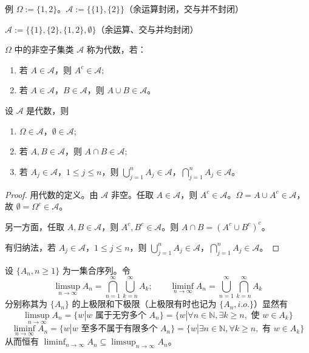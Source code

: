 \documentclass[lang=cn,10pt,thmcnt=section]{elegantbook}
\begin{document}
例 \(\Omega := \{1,2\}\)。\(\mathscr{A} := \{\{1\},\{2\}\}\)（余运算封闭，交与并不封闭）

\(\mathscr{A} := \{\{1\},\{2\},\{1,2\},\emptyset\}\)（余运算、交与并均封闭）

\begin{definition}
	\(\Omega\) 中的非空子集类 \(\mathscr{A}\) 称为代数，若：
\begin{enumerate}
    \item 若 \(A \in \mathscr{A}\)，则 \(A^c \in \mathscr{A}\);
    \item 若 \(A \in \mathscr{A}\)，\(B \in \mathscr{A}\)，则 \(A \cup B \in \mathscr{A}\)。
\end{enumerate}
\end{definition}
\begin{theorem}
	设 \(\mathscr{A}\) 是代数，则
\begin{enumerate}
    \item \(\Omega \in \mathscr{A}\)，\(\emptyset \in \mathscr{A}\);
    \item 若 \(A, B \in \mathscr{A}\)，则 \(A \cap B \in \mathscr{A}\);
    \item 若 \(A_j \in \mathscr{A}\)，\(1 \leq j \leq n\)，则 \(\bigcup_{j=1}^{n} A_j \in \mathscr{A}\)，\(\bigcap_{j=1}^{n} A_j \in \mathscr{A}\)。
\end{enumerate}
\end{theorem}
\begin{proof}
	\quad 用代数的定义。由 \(\mathscr{A}\) 非空。任取 \(A \in \mathscr{A}\)，则 \(A^c \in \mathscr{A}\)。\(\Omega = A \cup A^c \in \mathscr{A}\)，故 \(\emptyset = \Omega^c \in \mathscr{A}\)。

另一方面，任取 \(A, B \in \mathscr{A}\)，则 \(A^c, B^c \in \mathscr{A}\)。则 \(A \cap B = (A^c \cup B^c)^c\)。

有归纳法，若 \(A_j \in \mathscr{A}\)，\(1 \leq j \leq n\)，则 \(\bigcup_{j=1}^{n} A_j \in \mathscr{A}\)，\(\bigcap_{j=1}^{n} A_j \in \mathscr{A}\)。
\end{proof}
\begin{definition}
	设 \(\{A_n, n \geq 1\}\) 为一集合序列。令
\[
\limsup_{n \to \infty} A_n = \bigcap_{n=1}^{\infty} \bigcup_{k=n}^{\infty} A_k; \qquad \liminf_{n \to \infty} A_n = \bigcup_{n=1}^{\infty} \bigcap_{k=n}^{\infty} A_k
\]
分别称其为 \(\{A_n\}\) 的上极限和下极限（上极限有时也记为 \(\{A_n, i.o.\}\)）显然有
\[
\limsup_{n \to \infty} A_n = \{w | w \text{ 属于无穷多个 } A_n\} = \{w | \forall n \in \mathbb{N}, \exists k \geq n, \text{ 使 } w \in A_k\}
\]
\[
\liminf_{n \to \infty} A_n = \{w | w \text{ 至多不属于有限多个 } A_n\} = \{w | \exists n \in \mathbb{N}, \forall k \geq n, \text{ 有 } w \in A_k\}
\]
从而恒有 \(\liminf_{n \to \infty} A_n \subseteq \limsup_{n \to \infty} A_n\)。
\end{definition}
\end{document}
